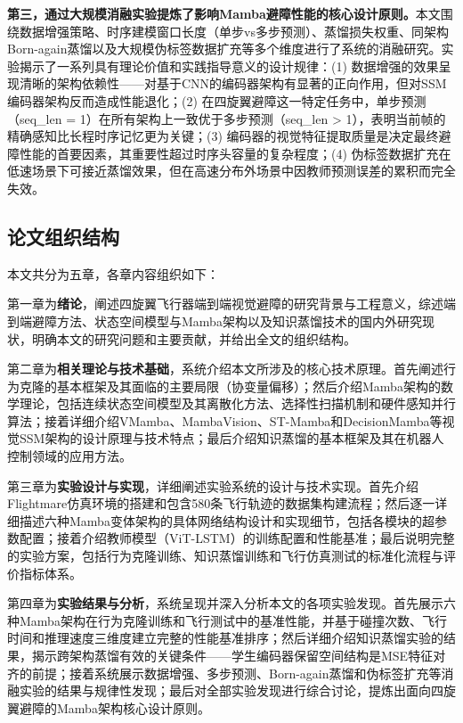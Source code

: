 \documentclass[12pt,a4paper]{article}
\numberwithin{equation}{section}
\numberwithin{figure}{section}
\numberwithin{table}{section}
\begin{document}
\textbf{第三，通过大规模消融实验提炼了影响Mamba避障性能的核心设计原则。}本文围绕数据增强策略、时序建模窗口长度（单步vs多步预测）、蒸馏损失权重、同架构Born-again蒸馏以及大规模伪标签数据扩充等多个维度进行了系统的消融研究。实验揭示了一系列具有理论价值和实践指导意义的设计规律：(1) 数据增强的效果呈现清晰的架构依赖性——对基于CNN的编码器架构有显著的正向作用，但对SSM编码器架构反而造成性能退化；(2) 在四旋翼避障这一特定任务中，单步预测（seq\_len = 1）在所有架构上一致优于多步预测（seq\_len > 1），表明当前帧的精确感知比长程时序记忆更为关键；(3) 编码器的视觉特征提取质量是决定最终避障性能的首要因素，其重要性超过时序头容量的复杂程度；(4) 伪标签数据扩充在低速场景下可接近蒸馏效果，但在高速分布外场景中因教师预测误差的累积而完全失效。

\subsection{论文组织结构}

本文共分为五章，各章内容组织如下：

第一章为\textbf{绪论}，阐述四旋翼飞行器端到端视觉避障的研究背景与工程意义，综述端到端避障方法、状态空间模型与Mamba架构以及知识蒸馏技术的国内外研究现状，明确本文的研究问题和主要贡献，并给出全文的组织结构。

第二章为\textbf{相关理论与技术基础}，系统介绍本文所涉及的核心技术原理。首先阐述行为克隆的基本框架及其面临的主要局限（协变量偏移）；然后介绍Mamba架构的数学理论，包括连续状态空间模型及其离散化方法、选择性扫描机制和硬件感知并行算法；接着详细介绍VMamba、MambaVision、ST-Mamba和DecisionMamba等视觉SSM架构的设计原理与技术特点；最后介绍知识蒸馏的基本框架及其在机器人控制领域的应用方法。

第三章为\textbf{实验设计与实现}，详细阐述实验系统的设计与技术实现。首先介绍Flightmare仿真环境的搭建和包含580条飞行轨迹的数据集构建流程；然后逐一详细描述六种Mamba变体架构的具体网络结构设计和实现细节，包括各模块的超参数配置；接着介绍教师模型（ViT-LSTM）的训练配置和性能基准；最后说明完整的实验方案，包括行为克隆训练、知识蒸馏训练和飞行仿真测试的标准化流程与评价指标体系。

第四章为\textbf{实验结果与分析}，系统呈现并深入分析本文的各项实验发现。首先展示六种Mamba架构在行为克隆训练和飞行测试中的基准性能，并基于碰撞次数、飞行时间和推理速度三维度建立完整的性能基准排序；然后详细介绍知识蒸馏实验的结果，揭示跨架构蒸馏有效的关键条件——学生编码器保留空间结构是MSE特征对齐的前提；接着系统展示数据增强、多步预测、Born-again蒸馏和伪标签扩充等消融实验的结果与规律性发现；最后对全部实验发现进行综合讨论，提炼出面向四旋翼避障的Mamba架构核心设计原则。
\end{document}
